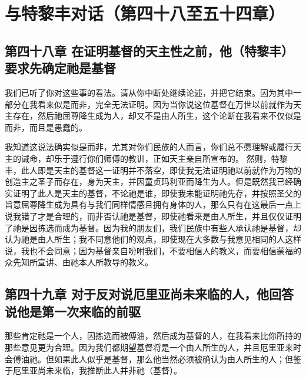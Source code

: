 
\section{与特黎丰对话（第四十八至五十四章）}


\subsection{第四十八章 在证明基督的天主性之前，他（特黎丰）要求先确定祂是基督}

我们已听了你对这些事的看法。请从你中断处继续论述，并把它结束。因为其中一部分在我看来似是而非，完全无法证明。因为当你说这位基督在万世以前就作为天主存在，然后祂屈尊降生成为人，却又不是由人所生，这个论断在我看来不仅似是而非，而且是愚蠢的。\par

我知道这说法确实似是而非，尤其对你们民族的人而言，你们总不愿理解或履行天主的诫命，却乐于遵行你们师傅的教训，正如天主亲自所宣布的。 然则，特黎丰，此人即是天主的基督这一证明并不落空，即使我无法证明祂以前就作为万物的创造主之圣子而存在，身为天主，并因童贞玛利亚而降生为人。但是既然我已经确实证明了此人是天主的基督，不论祂是谁，即使我未能证明祂先存，并按照圣父的旨意屈尊降生成为具有与我们同样情感且拥有身体的人，那么只有在这最后一点上说我错了才是合理的，而非否认祂是基督，即使祂看来是由人所生，并且仅仅证明了祂是因拣选而成为基督。因为我的朋友们，我们民族中有些人承认祂是基督，却认为祂是由人所生；我不同意他们的观点，即使现在大多数与我意见相同的人这样说，我也不会同意；因为基督亲自吩咐我们，不要相信人的教义，而要相信蒙福的众先知所宣讲、由祂本人所教导的教义。\par


\subsection{第四十九章 对于反对说厄里亚尚未来临的人，他回答说他是第一次来临的前驱}

那些肯定祂是一个人，因拣选而被傅油，然后成为基督的人，在我看来比你所持的那些意见更为合理。因为我们都期望基督将是一个由人所生的人，并且厄里亚来时会傅油祂。但如果此人似乎是基督，那么他当然必须被确认为由人所生的人；但鉴于厄里亚尚未来临，我推断此人并非祂（基督）。\par

